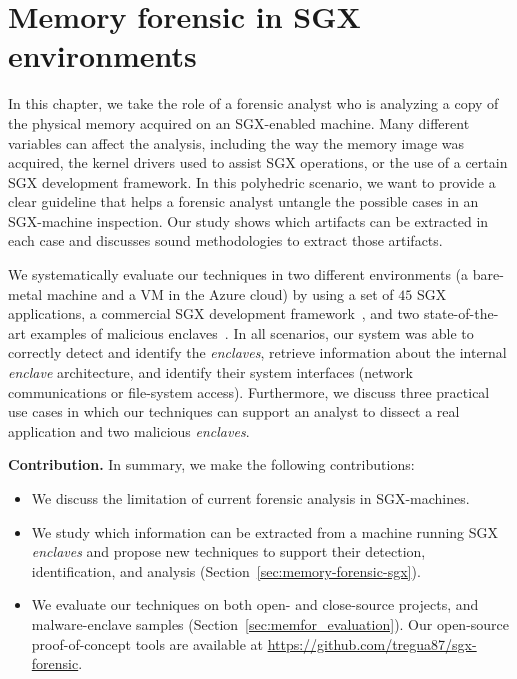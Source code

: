 \chapter{Memory forensic in SGX environments}
\label{chp:forensic}


In this chapter, we take the role of a forensic analyst who is analyzing a copy 
of the physical memory acquired on an SGX-enabled machine. 
Many different variables can affect the analysis, including the way the memory 
image was acquired, the kernel drivers used to assist SGX operations, or the 
use of a certain SGX development framework. In this polyhedric scenario, we 
want to provide a clear guideline that helps a forensic analyst untangle the 
possible cases in an SGX-machine inspection. Our study shows which artifacts 
can be extracted in each case and discusses sound methodologies to extract those
artifacts.

We systematically evaluate our techniques in two different environments (a 
bare-metal machine and a VM in the Azure cloud) by using a set of $45$ SGX 
applications, a commercial SGX development framework~\citep{conclave}, and two 
state-of-the-art examples of malicious enclaves~\citep{sgxrop,snakegx}.
In all scenarios, our system was able to correctly detect and identify the
\emph{enclaves}, retrieve information about the
internal \emph{enclave} architecture, and identify their system interfaces
(\eg network communications or file-system access).
Furthermore, we discuss three practical use cases in which our techniques
can support an analyst to dissect a real application and two malicious 
\emph{enclaves}.

\vspace{0.2cm}
\noindent \textbf{Contribution.} In summary, we make the following 
contributions:
\begin{itemize}
	\item We discuss the limitation of current forensic analysis in 
	SGX-machines.
	\item We study which information can be extracted from a machine running 
	SGX \emph{enclaves} and propose new techniques to support their detection, 
	identification, and analysis (Section~\ref{sec:memory-forensic-sgx}).
	\item We evaluate our techniques on both open- and close-source projects, 
	and malware-enclave samples (Section~\ref{sec:memfor_evaluation}).
	Our open-source proof-of-concept tools are available 
	at \url{https://github.com/tregua87/sgx-forensic}.
\end{itemize}

